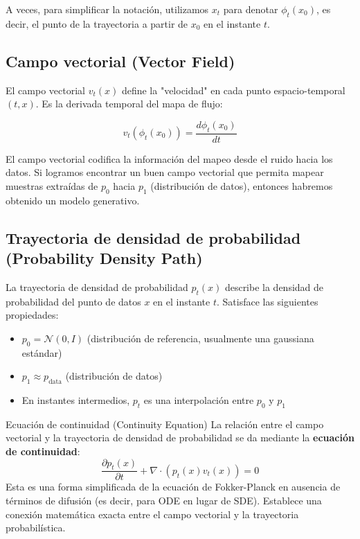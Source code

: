 \documentclass[a4paper]{article}
\begin{document}
A veces, para simplificar la notación, utilizamos $x_t$ para denotar $\phi_t(x_0)$, es decir, el punto de la trayectoria a partir de $x_0$ en el instante $t$.

\subsection{Campo vectorial (Vector Field)}

El campo vectorial $v_t(x)$ define la "velocidad" en cada punto espacio-temporal $(t, x)$. Es la derivada temporal del mapa de flujo:

$$v_t(\phi_t(x_0)) = \frac{d\phi_t(x_0)}{dt}$$

El campo vectorial codifica la información del mapeo desde el ruido hacia los datos. Si logramos encontrar un buen campo vectorial que permita mapear muestras extraídas de $p_0$ hacia $p_1$ (distribución de datos), entonces habremos obtenido un modelo generativo.

\subsection{Trayectoria de densidad de probabilidad (Probability Density Path)}

La trayectoria de densidad de probabilidad $p_t(x)$ describe la densidad de probabilidad del punto de datos $x$ en el instante $t$. Satisface las siguientes propiedades:
\begin{itemize}
    \item $p_0 = \mathcal{N}(0, I)$ (distribución de referencia, usualmente una gaussiana estándar)
    \item $p_1 \approx p_{\text{data}}$ (distribución de datos)
    \item En instantes intermedios, $p_t$ es una interpolación entre $p_0$ y $p_1$
\end{itemize}

\begin{knowledgebox}{Ecuación de continuidad (Continuity Equation)}
La relación entre el campo vectorial y la trayectoria de densidad de probabilidad se da mediante la \textbf{ecuación de continuidad}:
$$\frac{\partial p_t(x)}{\partial t} + \nabla \cdot (p_t(x) v_t(x)) = 0$$
Esta es una forma simplificada de la ecuación de Fokker-Planck en ausencia de términos de difusión (es decir, para ODE en lugar de SDE). Establece una conexión matemática exacta entre el campo vectorial y la trayectoria probabilística.
\end{knowledgebox}
\end{document}
